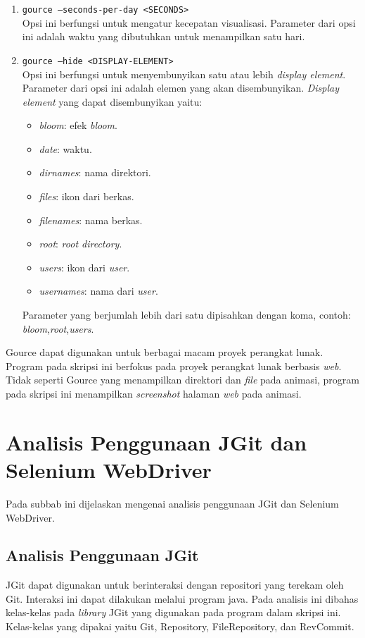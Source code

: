 \begin{enumerate}
\item \texttt{gource --seconds-per-day <SECONDS>}\\
Opsi ini berfungsi untuk mengatur kecepatan visualisasi. Parameter dari opsi ini adalah waktu yang dibutuhkan untuk menampilkan satu hari.

\item \texttt{gource --hide <DISPLAY-ELEMENT>}\\
Opsi ini berfungsi untuk menyembunyikan satu atau lebih \textit{display element}. Parameter dari opsi ini adalah elemen yang akan disembunyikan. \textit{Display element} yang dapat disembunyikan yaitu:
\begin{itemize}
\item \textit{bloom}: efek \textit{bloom}. 
\item \textit{date}: waktu.  
\item \textit{dirnames}: nama direktori. 
\item \textit{files}: ikon dari berkas. 
\item \textit{filenames}: nama berkas. 
\item \textit{root}: \textit{root directory}.
\item \textit{users}: ikon dari \textit{user}.
\item \textit{usernames}: nama dari \textit{user}.
\end{itemize}
Parameter yang berjumlah lebih dari satu dipisahkan dengan koma, contoh: \textit{bloom},\textit{root},\textit{users}.
\end{enumerate}
 
Gource dapat digunakan untuk berbagai macam proyek perangkat lunak. Program pada skripsi ini berfokus pada proyek perangkat lunak berbasis \textit{web}. Tidak seperti Gource yang menampilkan direktori dan \textit{file} pada animasi, program pada skripsi ini menampilkan \textit{screenshot} halaman \textit{web} pada animasi.      
 
\section{Analisis Penggunaan JGit dan Selenium WebDriver}
\label{sec:analisis_jgit_selenium}
Pada subbab ini dijelaskan mengenai analisis penggunaan JGit dan Selenium WebDriver.

\subsection{Analisis Penggunaan JGit}
\label{subsec:analisis_jgit}
JGit dapat digunakan untuk berinteraksi dengan repositori yang terekam oleh Git. Interaksi ini dapat dilakukan melalui program java. Pada analisis ini dibahas kelas-kelas pada \textit{library} JGit yang digunakan pada program dalam skripsi ini. Kelas-kelas yang dipakai yaitu Git, Repository, FileRepository, dan RevCommit.

